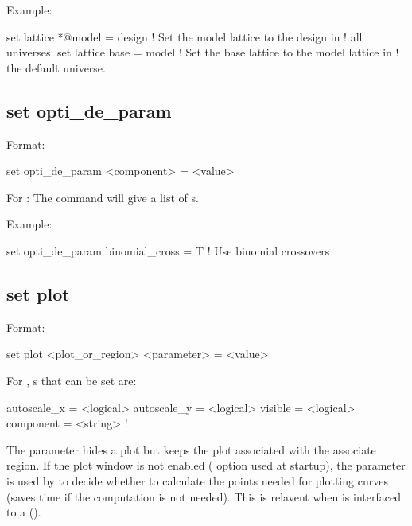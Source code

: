 {{Example:
\begin{example}
  set lattice *@model = design  ! Set the model lattice to the design in 
                                !   all universes.
  set lattice base = model      ! Set the base lattice to the model lattice in 
                                !   the default universe.
\end{example}


\subsection{set opti_de_param}
\label{s:set.opti.de.param}

Format:
\begin{example}
  set opti_de_param <component> = <value>
\end{example}

For : The  command will give a list of 
s.

Example:
\begin{example}
  set opti_de_param binomial_cross = T  ! Use binomial crossovers 
\end{example}


\subsection{set plot}
\label{s:set.plot}

Format:
\begin{example}
  set plot <plot_or_region> <parameter> = <value>
\end{example}

For , s that can be set are:
\begin{example}
  autoscale_x = <logical>
  autoscale_y = <logical>
  visible     = <logical>
  component   = <string>    ! 
\end{example}

The  parameter hides a plot but keeps the plot associated with the associate region. If
the plot window is not enabled ( option used at startup), the  parameter is
used by \tao to decide whether to calculate the points needed for plotting curves (saves time if the
computation is not needed). This is relavent when \tao is interfaced to a 
().

}}
